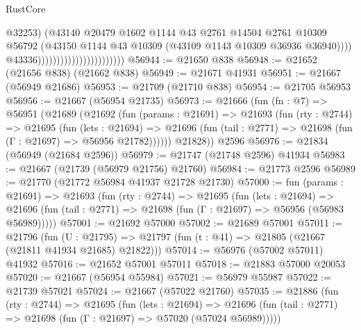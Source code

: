\begin{lexlean}{RustCore}
\begin{coremodule}
                                                      @32253)
                                                    (@43140
                                                      @20479
                                                      @1602
                                                      @1144
                                                      @43
                                                      @2761
                                                      @14504
                                                      @2761
                                                      @10309
                                                      @56792
                                                      (@43150
                                                        @1144
                                                        @43
                                                        @10309
                                                        (@43109 @1143 @10309 @36936 @36940))))
                                                  @43336)))))))))))))))))))))))
@56944 := @21650 @838
@56948 := @21652 (@21656 @838) (@21662 @838)
@56949 := @21671 @41931
@56951 := @21667 (@56949 @21686)
@56953 := @21709 (@21710 @838)
@56954 := @21705 @56953
@56956 := @21667 (@56954 @21735)
@56973 := @21666
    (fun (fn : @7) =>
    @56951
      (@21689
        (@21692
          (fun (params : @21691) =>
          @21693
            (fun (rty : @2744) =>
            @21695
              (fun (lets : @21694) =>
              @21696 (fun (tail : @2771) => @21698 (fun (Γ : @21697) => @56956 @21782))))))
        @21828))
    @2596
@56976 := @21834 (@56949 (@21684 @2596))
@56979 := @21747 (@21748 @2596) @41934
@56983 := @21667 (@21739 (@56979 @21756) @21760)
@56984 := @21773 @2596
@56989 := @21770 (@21772 @56984 @41937 @21728 @21730)
@57000 := fun (params : @21691) =>
  @21693
    (fun (rty : @2744) =>
    @21695
      (fun (lets : @21694) =>
      @21696 (fun (tail : @2771) => @21698 (fun (Γ : @21697) => @56956 (@56983 @56989)))))
@57001 := @21692 @57000
@57002 := @21689 @57001
@57011 := @21796
    (fun (U : @21795) => @21797 (fun (t : @41) => @21805 (@21667 (@21811 @41934 @21685) @21822)))
@57014 := @56976 (@57002 @57011) @41932
@57016 := @21652 @57001 @57011
@57018 := @21883 @57000 @20053
@57020 := @21667 (@56954 @55984)
@57021 := @56979 @55987
@57022 := @21739 @57021
@57024 := @21667 (@57022 @21760)
@57035 := @21886
    (fun (rty : @2744) =>
    @21695
      (fun (lets : @21694) =>
      @21696 (fun (tail : @2771) => @21698 (fun (Γ : @21697) => @57020 (@57024 @56989)))))

\end{coremodule}
\end{lexlean}
